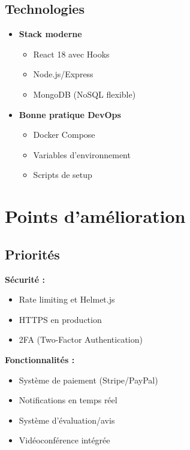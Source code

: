 \documentclass[12pt,a4paper]{article}
\begin{document}
\subsection{Technologies}

\begin{itemize}
    \item[\checkmark] \textbf{Stack moderne}
        \begin{itemize}
            \item React 18 avec Hooks
            \item Node.js/Express
            \item MongoDB (NoSQL flexible)
        \end{itemize}
    \item[\checkmark] \textbf{Bonne pratique DevOps}
        \begin{itemize}
            \item Docker Compose
            \item Variables d'environnement
            \item Scripts de setup
        \end{itemize}
\end{itemize}

\section{Points d'amélioration}

\subsection{Priorités}

\textbf{Sécurité :}
\begin{itemize}
    \item[$\square$] Rate limiting et Helmet.js
    \item[$\square$] HTTPS en production
    \item[$\square$] 2FA (Two-Factor Authentication)
\end{itemize}

\textbf{Fonctionnalités :}
\begin{itemize}
    \item[$\square$] Système de paiement (Stripe/PayPal)
    \item[$\square$] Notifications en temps réel
    \item[$\square$] Système d'évaluation/avis
    \item[$\square$] Vidéoconférence intégrée
\end{itemize}
\end{document}
